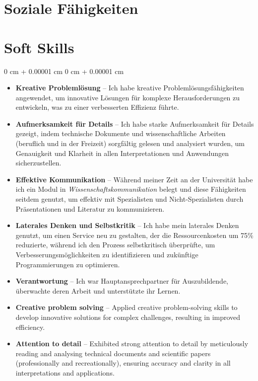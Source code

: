 \documentclass[10pt, letterpaper]{article}
\newenvironment{highlights}{
    \begin{itemize}[
        topsep=0.2 cm,
        parsep=0.2 cm,
        partopsep=0pt,
        itemsep=0.025 cm,
        leftmargin=0 cm + 10pt
    ]
}{
    \end{itemize}
}
\newenvironment{onecolentry}{
    \begin{adjustwidth}{
        0 cm + 0.00001 cm
    }{
        0 cm + 0.00001 cm
    }
}{
    \end{adjustwidth}
}
\begin{document}
        \vspace{0.15 cm}

    \ifdefined\german
    \section{Soziale Fähigkeiten}
    \else
    \section{Soft Skills}
    \fi

        \begin{onecolentry}
            \begin{highlights}
                \ifdefined\german
                \item \textbf{Kreative Problemlösung} -- Ich habe kreative Problemlösungsfähigkeiten angewendet, um innovative Lösungen für komplexe Herausforderungen zu entwickeln, was zu einer verbesserten Effizienz führte.
                \item \textbf{Aufmerksamkeit für Details} -- Ich habe starke Aufmerksamkeit für Details gezeigt, indem technische Dokumente und wissenschaftliche Arbeiten (beruflich und in der Freizeit) sorgfältig gelesen und analysiert wurden, um Genauigkeit und Klarheit in allen Interpretationen und Anwendungen sicherzustellen.
                \item \textbf{Effektive Kommunikation} -- Während meiner Zeit an der Universität habe ich ein Modul in \textit{Wissenschaftskommunikation} belegt und diese Fähigkeiten seitdem genutzt, um effektiv mit Spezialisten und Nicht-Spezialisten durch Präsentationen und Literatur zu kommunizieren.
                \item \textbf{Laterales Denken und Selbstkritik} -- Ich habe mein laterales Denken genutzt, um einen Service neu zu gestalten, der die Ressourcenkosten um 75\% reduzierte, während ich den Prozess selbstkritisch überprüfte, um Verbesserungsmöglichkeiten zu identifizieren und zukünftige Programmierungen zu optimieren.
                \item \textbf{Verantwortung} -- Ich war Hauptansprechpartner für Auszubildende, überwachte deren Arbeit und unterstützte ihr Lernen.
                \else
                \item \textbf{Creative problem solving} -- Applied creative problem-solving skills to develop innovative solutions for complex challenges, resulting in improved efficiency.
                \item \textbf{Attention to detail} -- Exhibited strong attention to detail by meticulously reading and analysing technical documents and scientific papers (professionally and recreationally), ensuring accuracy and clarity in all interpretations and applications.

\end{highlights}
\end{onecolentry}
\end{document}
